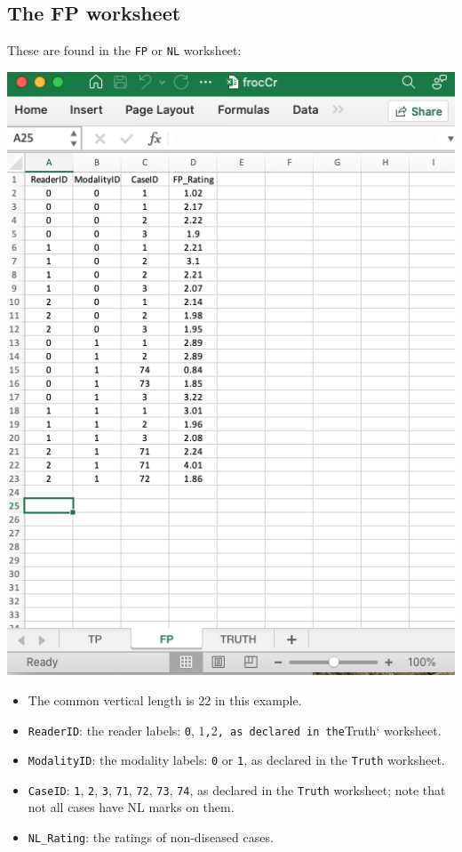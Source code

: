\documentclass[
]{book}
\providecommand{\tightlist}{%
  \setlength{\itemsep}{0pt}\setlength{\parskip}{0pt}}
\begin{document}
\hypertarget{the-fp-worksheet}{%
\subsection{The FP worksheet}\label{the-fp-worksheet}}

These are found in the \texttt{FP} or \texttt{NL} worksheet:

\includegraphics[width=1\textwidth,height=\textheight]{images/software-details/frocCrFp.png}

\begin{itemize}
\tightlist
\item
  The common vertical length is 22 in this example.
\item
  \texttt{ReaderID}: the reader labels: \texttt{0}, 1\texttt{,}2\texttt{,\ as\ declared\ in\ the}Truth` worksheet.
\item
  \texttt{ModalityID}: the modality labels: \texttt{0} or \texttt{1}, as declared in the \texttt{Truth} worksheet.
\item
  \texttt{CaseID}: \texttt{1}, \texttt{2}, \texttt{3}, \texttt{71}, \texttt{72}, \texttt{73}, \texttt{74}, as declared in the \texttt{Truth} worksheet; note that not all cases have NL marks on them.\\
\item
  \texttt{NL\_Rating}: the ratings of non-diseased cases.
\end{itemize}
\end{document}

